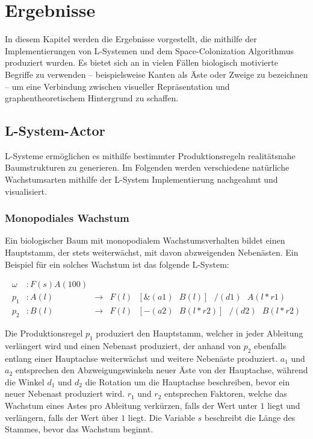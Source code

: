\chapter{Ergebnisse}
In diesem Kapitel werden die Ergebnisse vorgestellt, die mithilfe der Implementierungen von L-Systemen und dem Space-Colonization Algorithmus produziert wurden. Es bietet sich an in vielen Fällen biologisch motivierte Begriffe zu verwenden -- beispielsweise Kanten als Äste oder Zweige zu bezeichnen -- um eine Verbindung zwischen visueller Repräsentation und graphentheoretischem Hintergrund zu schaffen.

\section{L-System-Actor}
L-Systeme ermöglichen es mithilfe bestimmter Produktionsregeln realitätsnahe Baumstrukturen zu generieren. Im Folgenden werden verschiedene natürliche Wachstumsarten mithilfe der L-System Implementierung nachgeahmt und visualisiert.
\subsection{Monopodiales Wachstum}
Ein biologischer Baum mit monopodialem Wachstumsverhalten bildet einen Hauptstamm, der stets weiterwächst, mit davon abzweigenden Nebenästen. \cite[S.14]{Deussen:05} Ein Beispiel für ein solches Wachstum ist das folgende L-System:

\begin{equation}
\begin{array}{llll}
\omega & : F(s)A(100) \\
p_1 & : A(l) &\rightarrow& F(l)\text{ }[\&(a1)\text{ }B(l)]\text{ }/(d1)\text{ }A(l*r1) \\
p_2 &  : B(l) &\rightarrow& F(l)\text{ }[-(a2)\text{ }B(l*r2)]\text{ }/(d2)\text{ }B(l*r2)
\end{array}
\label{eq:ProdMonopodial}
\end{equation} 
\cite[S.56]{ABOP:04}

Die Produktionsregel $p_1$ produziert den Hauptstamm, welcher in jeder Ableitung verlängert wird und einen Nebenast produziert, der anhand von $p_2$ ebenfalls entlang einer Hauptachse weiterwächst und weitere Nebenäste produziert. $a_1$ und $a_2$ entsprechen den Abzweigungswinkeln neuer Äste von der Hauptachse, während die Winkel $d_1$ und $d_2$ die Rotation um die Hauptachse beschreiben, bevor ein neuer Nebenast produziert wird. $r_1$ und $r_2$ entsprechen Faktoren, welche das Wachstum eines Astes pro Ableitung verkürzen, falls der Wert unter $1$ liegt und verlängern, falls der Wert über $1$ liegt. Die Variable $s$ beschreibt die Länge des Stammes, bevor das Wachstum beginnt. \cite[S.57]{ABOP:04}

